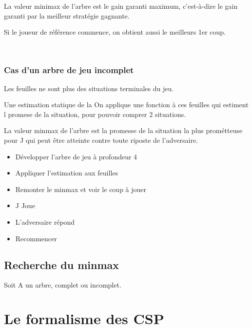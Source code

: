 \documentclass[12pt,a4paper,openany]{book}
\begin{document}
	\begin{attention}
		La valeur minimax de l'arbre est le gain garanti maximum, c'est-à-dire le gain garanti par la meilleur stratégie gagnante.
	\end{attention}

	\begin{remarque}
		Si le joueur de référence commence, on obtient aussi le meilleurs 1er coup.

~
	\end{remarque}
	
	\subsection{Cas d'un arbre de jeu incomplet}
	\begin{attention}
		Les feuilles ne sont plus des situations terminales du jeu.
	\end{attention}

	Une estimation statique de la On applique une fonction à ces feuilles qui estiment l promese de la situation, pour pouvoir comprer 2 situations.
	
	La valeur minmax de l'arbre est la promesse de la situation la plus prométteuse pour J qui peut être atteinte contre toute riposte de
	l'adversaire.
	
\begin{itemize}
	\item Développer l'arbre de jeu à profondeur 4
	\item Appliquer l'estimation aux feuilles
	\item Remonter le minmax et voir le coup à jouer
	\item J Joue
	\item L'adversaire répond
	\item Recommencer
\end{itemize}

\section{Recherche du minmax}
Soit A un arbre, complet ou incomplet.


	\chapter{Le formalisme des CSP}
\end{document}
